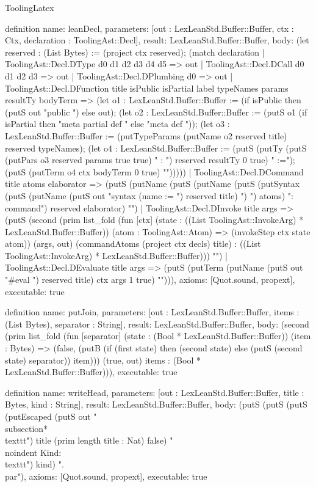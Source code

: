 \begin{lexlean}{ToolingLatex}
\begin{semanticmodule}
definition{
  name: leanDecl,
  parameters: [out : LexLeanStd.Buffer::Buffer, ctx : Ctx, declaration : ToolingAst::Decl],
  result: LexLeanStd.Buffer::Buffer,
  body: (let reserved : (List Bytes) := (project ctx reserved); (match declaration
    | ToolingAst::Decl.DType d0 d1 d2 d3 d4 d5 => out
    | ToolingAst::Decl.DCall d0 d1 d2 d3 => out
    | ToolingAst::Decl.DPlumbing d0 => out
    | ToolingAst::Decl.DFunction title isPublic isPartial label typeNames params resultTy bodyTerm => (let o1 : LexLeanStd.Buffer::Buffer := (if isPublic then (putS out "public ") else out); (let o2 : LexLeanStd.Buffer::Buffer := (putS o1 (if isPartial then "meta partial def " else "meta def ")); (let o3 : LexLeanStd.Buffer::Buffer := (putTypeParams (putName o2 reserved title) reserved typeNames); (let o4 : LexLeanStd.Buffer::Buffer := (putS (putTy (putS (putPars o3 reserved params true true) " : ") reserved resultTy 0 true) " :=\n  "); (putS (putTerm o4 ctx bodyTerm 0 true) "\n")))))
    | ToolingAst::Decl.DCommand title atoms elaborator => (putS (putName (putS (putName (putS (putSyntax (putS (putName (putS out "syntax (name := ") reserved title) ") ") atoms) ": command ") reserved elaborator) "\n")
    | ToolingAst::Decl.DInvoke title args => (putS (second (prim list_fold (fun [ctx] (state : ((List ToolingAst::InvokeArg) * LexLeanStd.Buffer::Buffer)) (atom : ToolingAst::Atom) => (invokeStep ctx state atom)) (args, out) (commandAtoms (project ctx decls) title) : ((List ToolingAst::InvokeArg) * LexLeanStd.Buffer::Buffer))) "\n")
    | ToolingAst::Decl.DEvaluate title args => (putS (putTerm (putName (putS out "#eval ") reserved title) ctx args 1 true) "\n"))),
  axioms: [Quot.sound, propext],
  executable: true
}

definition{
  name: putJoin,
  parameters: [out : LexLeanStd.Buffer::Buffer, items : (List Bytes), separator : String],
  result: LexLeanStd.Buffer::Buffer,
  body: (second (prim list_fold (fun [separator] (state : (Bool * LexLeanStd.Buffer::Buffer)) (item : Bytes) => (false, (putB (if (first state) then (second state) else (putS (second state) separator)) item))) (true, out) items : (Bool * LexLeanStd.Buffer::Buffer))),
  executable: true
}

definition{
  name: writeHead,
  parameters: [out : LexLeanStd.Buffer::Buffer, title : Bytes, kind : String],
  result: LexLeanStd.Buffer::Buffer,
  body: (putS (putS (putS (putEscaped (putS out "\\subsection*{\\texttt{") title (prim length title : Nat) false) "}}\n\\noindent Kind: \\texttt{") kind) "}.\\par\n"),
  axioms: [Quot.sound, propext],
  executable: true
}


\end{semanticmodule}
\end{lexlean}
